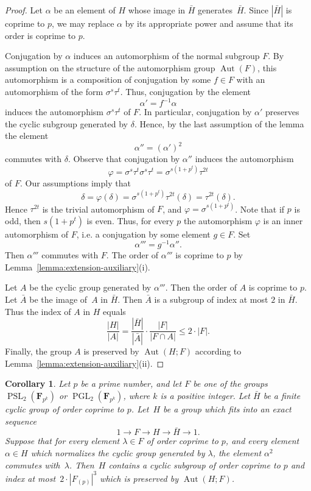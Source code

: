 \documentclass[12pt]{amsart}
\numberwithin{equation}{section}
\newtheorem{corollary}[subsection]{Corollary}
\theoremstyle{definition}
\DeclareMathOperator{\Aut}{Aut}
\DeclareMathOperator{\PGL}{PGL}
\DeclareMathOperator{\PSL}{PSL}
\def \le {\leqslant}
\begin{document}
\begin{proof}
Let $\alpha$ be an element of $H$ whose image in $\bar{H}$ generates~$\bar{H}$.
Since $|\bar{H}|$ is coprime to $p$, we may replace $\alpha$ by its appropriate power and assume that its order is coprime to $p$.

Conjugation by $\alpha$ induces an automorphism of the normal subgroup $F$.
By assumption on the structure of the automorphism group $\Aut(F)$,
this automorphism is a composition of conjugation by some $f\in F$ with an automorphism
of the form $\sigma^s\tau^t$.
Thus, conjugation by the element
$$
\alpha'=f^{-1}\alpha
$$
induces the automorphism $\sigma^s\tau^t$ of $F$.
In particular, conjugation by $\alpha'$ preserves the cyclic subgroup
generated by $\delta$. Hence, by the last assumption of the lemma the element
$$
\alpha''=(\alpha')^2
$$
commutes with $\delta$. Observe that conjugation by $\alpha''$
induces the automorphism
$$
\varphi=\sigma^s\tau^t\sigma^s\tau^t=\sigma^{s(1+p^t)}\tau^{2t}
$$
of $F$. Our assumptions imply that
$$
\delta=\varphi(\delta)=\sigma^{s(1+p^t)}\tau^{2t}(\delta)=\tau^{2t}(\delta).
$$
Hence $\tau^{2t}$ is the trivial automorphism of $F$, and
$\varphi=\sigma^{s(1+p^t)}$. Note that if $p$ is odd, then
$s(1+p^t)$ is even. Thus, for every $p$ the automorphism $\varphi$ is
an inner automorphism of $F$, i.e. a conjugation by some element $g\in F$.
Set
$$
\alpha'''=g^{-1}\alpha''.
$$
Then $\alpha'''$ commutes with $F$.
The order of $\alpha'''$ is coprime to $p$ by Lemma~\ref{lemma:extension-auxiliary}(i).

Let $A$ be the cyclic group generated by $\alpha'''$.
Then the order of $A$ is coprime to $p$.
Let $\bar{A}$ be the image of~$A$ in
$\bar{H}$. Then
$\bar{A}$ is a subgroup of index at most $2$ in $\bar{H}$.
Thus the index of $A$ in $H$ equals
$$
\frac{|H|}{|A|}=\frac{|\bar{H}|}{|\bar{A}|}\cdot \frac{|F|}{|F\cap A|}\le 2\cdot |F|.
$$
Finally, the group $A$ is preserved by $\Aut(H;F)$
according to Lemma~\ref{lemma:extension-auxiliary}(ii).
\end{proof}

\begin{corollary}\label{corollary:PSL-group-extension}
Let $p$ be a prime number, and let $F$ be one of the groups~\mbox{$\PSL_2(\mathbf{F}_{p^k})$}
or $\PGL_2(\mathbf{F}_{p^k})$, where $k$ is a positive integer.
Let $\bar{H}$ be a finite cyclic group of order coprime to $p$.
Let~$H$ be a group which fits into an exact sequence
$$
1\to F\to H\to \bar{H}\to 1.
$$
Suppose that for every element
$\lambda\in F$ of order coprime to $p$, and every element~\mbox{$\alpha\in H$}
which normalizes the cyclic group generated by $\lambda$, the element $\alpha^2$
commutes with~$\lambda$.
Then~$H$ contains a cyclic subgroup of order coprime to $p$ and index at
most~$2\cdot |F_{(p)}|^3$ which is preserved by $\Aut(H;F)$.
\end{corollary}
\end{document}
